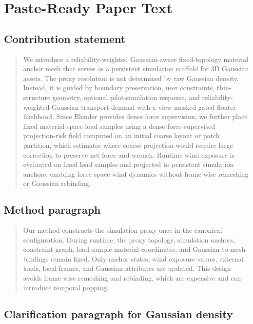 \documentclass[11pt,a4paper]{article}
\begin{document}
\section{Paste-Ready Paper Text}

\subsection{Contribution statement}

\begin{quote}
We introduce a reliability-weighted Gaussian-aware fixed-topology material anchor mesh that serves as a persistent simulation scaffold for 3D Gaussian assets. The proxy resolution is not determined by raw Gaussian density. Instead, it is guided by boundary preservation, user constraints, thin-structure geometry, optional pilot-simulation response, and reliability-weighted Gaussian transport demand with a view-masked gated floater likelihood. Since Blender provides dense force supervision, we further place fixed material-space load samples using a dense-force-supervised projection-risk field computed on an initial coarse layout or patch partition, which estimates where coarse projection would require large correction to preserve net force and wrench. Runtime wind exposure is evaluated on fixed load samples and projected to persistent simulation anchors, enabling force-space wind dynamics without frame-wise remeshing or Gaussian rebinding.
\end{quote}

\subsection{Method paragraph}

\begin{quote}
Our method constructs the simulation proxy once in the canonical configuration. During runtime, the proxy topology, simulation anchors, constraint graph, load-sample material coordinates, and Gaussian-to-mesh bindings remain fixed. Only anchor states, wind exposure values, external loads, local frames, and Gaussian attributes are updated. This design avoids frame-wise remeshing and rebinding, which are expensive and can introduce temporal popping.
\end{quote}

\subsection{Clarification paragraph for Gaussian density}
\end{document}
